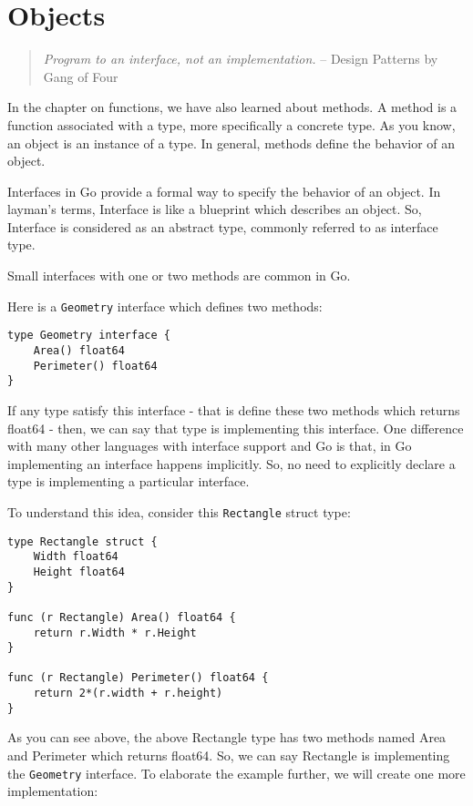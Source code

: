 \cleardoublepage
{}
\chapter{Objects}

\begin{quote}
\textit{Program to an interface, not an implementation.} -- Design Patterns by Gang of Four
\end{quote}


In the chapter on functions, we have also learned about methods.  A
method is a function associated with a type, more specifically a
concrete type.  As you know, an object is an instance of a type.  In
general, methods define the behavior of an object.

Interfaces in Go provide a formal way to specify the
behavior of an object.  In layman's terms, Interface is like a
blueprint which describes an object.  So, Interface is considered as
an abstract type, commonly referred to as interface type.

Small interfaces with one or two methods are common in Go.

Here is a \texttt{Geometry} interface which defines two methods:

\begin{lstlisting}[numbers=none]
type Geometry interface {
    Area() float64
    Perimeter() float64
}
\end{lstlisting}

If any type satisfy this interface - that is define these two methods
which returns float64 - then, we can say that type is implementing
this interface.  One difference with many other languages with
interface support and Go is that, in Go implementing an interface
happens implicitly.  So, no need to explicitly declare a type is
implementing a particular interface.

To understand this idea, consider this \texttt{Rectangle} struct type:

\begin{lstlisting}[numbers=none]
type Rectangle struct {
    Width float64
    Height float64
}

func (r Rectangle) Area() float64 {
    return r.Width * r.Height
}

func (r Rectangle) Perimeter() float64 {
    return 2*(r.width + r.height)
}
\end{lstlisting}

As you can see above, the above Rectangle type has two methods named
Area and Perimeter which returns float64.  So, we can say Rectangle is
implementing the \texttt{Geometry} interface.  To elaborate the
example further, we will create one more implementation:

